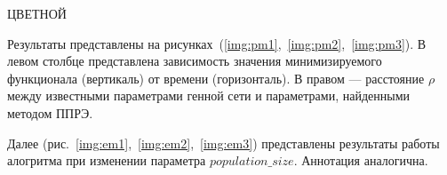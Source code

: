 { \color[HTML]{680100} ЦВЕТНОЙ }

Результаты представлены на 
рисунках~(\ref{img:pm1},~\ref{img:pm2},~\ref{img:pm3}). 
В левом столбце представлена зависимость значения минимизируемого функционала 
(вертикаль) от времени (горизонталь). В правом — расстояние $\rho$ между 
известными параметрами генной сети и параметрами, найденными методом ППРЭ.

Далее (рис.~\ref{img:em1},~\ref{img:em2},~\ref{img:em3}) представлены результаты
работы алогритма при изменении параметра $population\_size$. Аннотация 
аналогична.

% 
% 
% 
% 
% 



\clearpage
